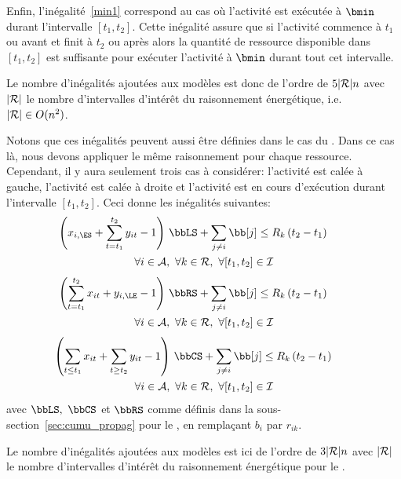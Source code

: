 Enfin, l'inégalité~\eqref{min1} correspond au cas où l'activité est
exécutée à $\bmin$ durant l'intervalle $[t_1,t_2]$. Cette inégalité
assure que si l'activité commence à $t_1$ ou avant et finit à $t_2$ ou
après alors la quantité de ressource disponible dans $[t_1,t_2]$ est
suffisante pour exécuter l'activité à $\bmin$ durant tout cet
intervalle.

Le nombre d'inégalités ajoutées aux modèles est donc de l'ordre de
$5|{\cal R}|n$ avec $|{\cal R}|$ le nombre d'intervalles d'intérêt du raisonnement
énergétique, i.e. $|{\cal R}| \in O(n^2)$.


Notons que ces inégalités peuvent aussi être définies dans le cas du
\RCPSP. Dans ce cas là, nous devons appliquer le même raisonnement
pour chaque ressource. Cependant, il y aura seulement trois cas à
considérer: l'activité est calée à gauche, l'activité est calée à
droite et l'activité est en cours d'exécution durant l'intervalle
$[t_1,t_2]$. Ceci donne les inégalités suivantes:
\begin{multline} \left(x_{i,\ES} + \sum_{t=t_1}^{t_2}y_{it} -1\right)
\, \bbLS + \sum_{j\neq i} \bb[j] \le R_k\left(t_2-t_1\right)
\qquad \\ \forall i \in {\cal A},\ \forall k \in \R ,\ \forall
[t_1,t_2] \in \I
    \label{RCPSP_left}
\end{multline} \vspace{-1.3cm}
\begin{multline} \left(\sum_{t=t_1}^{t_2}x_{it} + y_{i,\LE}-1\right)
\, \bbRS + \sum_{j\neq i} \bb[j] \le R_k\left(t_2-t_1\right)
\qquad \\ \forall i \in {\cal A},\ \forall k \in \R ,\ \forall
[t_1,t_2] \in \I
    \label{RCPSP_right}
\end{multline} \vspace{-1.3cm}
\begin{multline} \left(\sum_{t\le t_1}x_{it} + \sum_{t\ge t_2}y_{it}
-1 \right) \, \bbCS + \sum_{j\neq i} \bb[j] \le
R_k\left(t_2-t_1\right) \qquad \\ \forall i \in {\cal A},\ \forall k \in
\R ,\ \forall [t_1,t_2] \in \I
    \label{RCPSP_min}
\end{multline}
avec $\bbLS,\ \bbCS$ et $\bbRS$ comme définis dans la
sous-section~\ref{sec:cumu_propag} pour le \CUSP, en remplaçant $b_i$
par $r_{ik}$.

Le nombre d'inégalités ajoutées aux modèles est ici de l'ordre de
$3|{\cal R}|n$ avec $|{\cal R}|$ le nombre d'intervalles d'intérêt du raisonnement
énergétique pour le \RCPSP.

